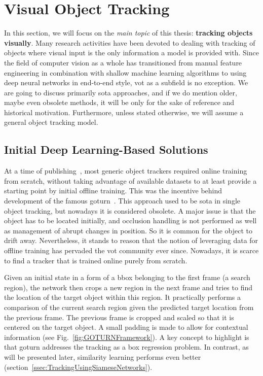 \section{Visual Object Tracking}
\label{sec:VisualObjectTracking}

In this section, we will focus on the \emph{main topic} of this thesis: \textbf{tracking objects visually}. Many research activities have been devoted to dealing with tracking of objects where visual input is the only information a model is provided with. Since the field of computer vision as a whole has transitioned from manual feature engineering in combination with shallow machine learning algorithms to using deep neural networks in end-to-end style, \gls{vot} as a subfield is no exception. We are going to discuss primarily \gls{sota} approaches, and if we do mention older, maybe even obsolete methods, it will be only for the sake of reference and historical motivation. Furthermore, unless stated otherwise, we will assume a general object tracking model.

\subsection{Initial Deep Learning-Based Solutions}
\label{ssec:InitialDeepLearningBasedSolutions}

At a time of publishing~\cite{Held2016}, most generic object trackers required online training from scratch, without taking advantage of available datasets to at least provide a starting point by initial offline training. This was the incentive behind development of the famous \gls{goturn}~\cite{Held2016}. This approach used to be \gls{sota} in single object tracking, but nowadays it is considered obsolete. A major issue is that the object has to be located initially, and occlusion handling is not performed as well as management of abrupt changes in position. So it is common for the object to drift away. Nevertheless, it stands to reason that the notion of leveraging data for offline training has pervaded the \gls{vot} community ever since. Nowadays, it is scarce to find a tracker that is trained online purely from scratch.

Given an initial state in a form of a \gls{bbox} belonging to the first frame (a search region), the network then crops a new region in the next frame and tries to find the location of the target object within this region. It practically performs a comparison of the current search region given the predicted target location from the previous frame. The previous frame is cropped and scaled so that it is centered on the target object. A small padding is made to allow for contextual information (see Fig.~\ref{fig:GOTURNFramework}). A key concept to highlight is that \gls{goturn} addresses the tracking as a box regression problem. In contrast, as will be presented later, similarity learning performs even better (section~\ref{ssec:TrackingUsingSiameseNetworks}).

